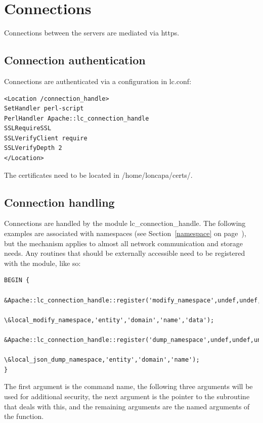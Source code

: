 \section{Connections}
Connections between the servers are mediated via https.
\subsection{Connection authentication}
Connections are authenticated via a configuration in lc.conf:
\begin{verbatim}
<Location /connection_handle>
SetHandler perl-script
PerlHandler Apache::lc_connection_handle
SSLRequireSSL
SSLVerifyClient require
SSLVerifyDepth 2
</Location>
\end{verbatim}
The certificates need to be located in /home/loncapa/certs/.

\subsection{Connection handling}
Connections are handled by the module lc\_connection\_handle. The following examples are associated with namespaces (see Section~\ref{namespace} on page~\pageref{namespace}), but the mechanism applies to almost all network communication and storage needs. Any routines that should be externally accessible need to be registered with the module, like so:
\begin{verbatim}
BEGIN {
    &Apache::lc_connection_handle::register('modify_namespace',undef,undef,undef,
                                            \&local_modify_namespace,'entity','domain','name','data');
    &Apache::lc_connection_handle::register('dump_namespace',undef,undef,undef,
                                            \&local_json_dump_namespace,'entity','domain','name');
}
\end{verbatim}
The first argument is the command name, the following three arguments will be used for additional security, the next argument is the pointer to the subroutine that deals with this, and the remaining arguments are the named arguments of the function.
